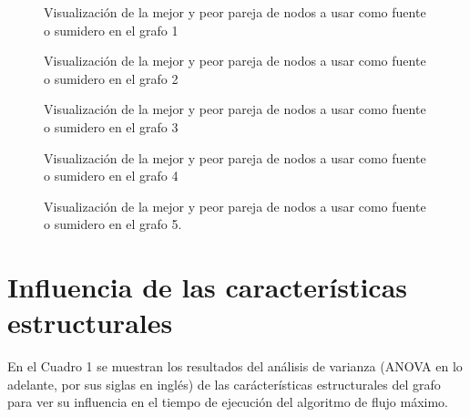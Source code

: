 \documentclass{article}
\begin{document}
\begin{figure}[htbp]
\caption{Visualización de la mejor y peor pareja de nodos a usar como fuente o sumidero en el grafo 1}
\label{Flujo1} 
\end{figure}

\begin{figure}[htbp]
\caption{Visualización de la mejor y peor pareja de nodos a usar como fuente o sumidero en el grafo 2}
\label{Flujo2} 
\end{figure}

\begin{figure}[htbp]
\caption{Visualización de la mejor y peor pareja de nodos a usar como fuente o sumidero en el grafo 3}
\label{Flujo3} 
\end{figure}

\begin{figure}[htbp]
\caption{Visualización de la mejor y peor pareja de nodos a usar como fuente o sumidero en el grafo 4}
\label{Flujo4} 
\end{figure}


\begin{figure}[htbp]
\caption{Visualización de la mejor y peor pareja de nodos a usar como fuente o sumidero en el grafo 5.}
\label{Flujo5} 
\end{figure}

\section*{Influencia de las características estructurales}


En el Cuadro 1 se muestran los resultados del análisis de varianza (ANOVA en lo adelante, por sus siglas en inglés) de las carácterísticas estructurales del grafo para ver su influencia en el tiempo de ejecución del algoritmo de flujo máximo.
\end{document}

